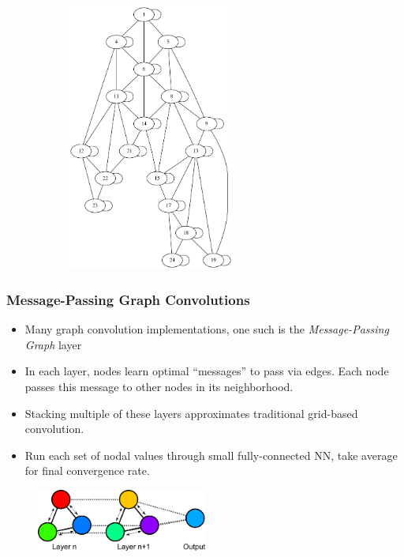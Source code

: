 \documentclass[handout]{beamer}
\renewcommand{\vec}[1]{ {\bf #1} }
\newcommand{\mat}[1]{ \vec{#1} }
\newcommand{\abs}[1]{ \left\lvert #1 \right\rvert }
\begin{document}
\begin{frame}
\begin{figure}[h]
\begin{subfigure}{.40\textwidth}
    \includegraphics[width=0.6\textwidth]{figures/graph.png}
  \end{subfigure}
\end{figure}
\end{frame}


\begin{frame}
  \frametitle{Message-Passing Graph Convolutions}
  \begin{itemize}
  \item Many graph convolution implementations, one such is the \textit{Message-Passing Graph} layer
  \item In each layer, nodes learn optimal ``messages'' to pass via edges.  Each node passes this message to other nodes in its neighborhood.
  \item Stacking multiple of these layers approximates traditional grid-based convolution.
  \item Run each set of nodal values through small fully-connected NN, take average for final convergence rate.
  \end{itemize}
   \begin{figure}[h]
    \includegraphics[width=0.5\textwidth]{figures/graphnet.png}
\end{figure}
\end{frame}
\end{document}
